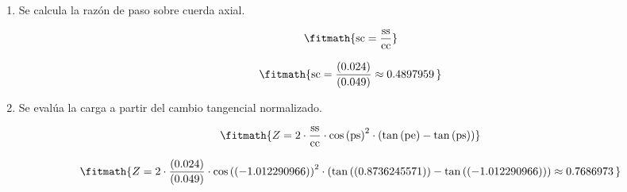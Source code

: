 \begin{enumerate}

\item Se calcula la razón de paso sobre cuerda axial.

\[\fitmath{\mathrm{sc}=\frac{\mathrm{ss}}{\mathrm{cc}}}\]

\[\fitmath{\mathrm{sc}=\frac{(0.024)}{(0.049)}\approx 0.4897959\,}\]

\item Se evalúa la carga a partir del cambio tangencial normalizado.

\[\fitmath{Z=2\cdot \frac{\mathrm{ss}}{\mathrm{cc}}\cdot {\cos\left(\mathrm{ps}\right)}^{2}\cdot \left(\tan\left(\mathrm{pe}\right)-\tan\left(\mathrm{ps}\right)\right)}\]

\[\fitmath{Z=2\cdot \frac{(0.024)}{(0.049)}\cdot {\cos\left((-1.012290966)\right)}^{2}\cdot \left(\tan\left((0.8736245571)\right)-\tan\left((-1.012290966)\right)\right)\approx 0.7686973\,}\]

\end{enumerate}
